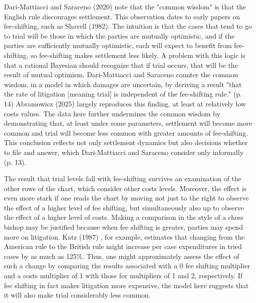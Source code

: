 \documentclass{article}
\begin{document}
Dari-Mattiacci and Saraceno (2020) note that the "common wisdom" is that the English rule discourages settlement. This observation dates to early papers on fee-shifting, such as Shavell (1982). The intuition is that the cases that tend to go to trial will be those in which the parties are mutually optimistic, and if the parties are sufficiently mutually optimistic, each will expect to benefit from fee-shifting, so fee-shifting makes settlement less likely. A problem with this logic is that a rational Bayesian should recognize that if trial occurs, that will be the result of mutual optimism. Dari-Mattiacci and Saraceno counter the common wisdom, in a model in which damages are uncertain, by deriving a result "that the rate of litigation [meaning trial] is independent of the fee-shifting rule." (p. 14) Abramowicz (2025) largely reproduces this finding, at least at relatively low costs values. The data here further undermines the common wisdom by demonstrating that, at least under some parameters, settlement will become more common and trial will become less common with greater amounts of fee-shifting. This conclusion reflects not only settlement dynamics but also decisions whether to file and answer, which Dari-Mattiacci and Saraceno consider only informally (p. 13). 

The result that trial levels fall with fee-shifting survives an examination of the other rows of the chart, which consider other costs levels. Moreover, the effect is even more stark if one reads the chart by moving not just to the right to observe the effect of a higher level of fee shifting, but simultaneously also up to observe the effect of a higher level of costs. Making a comparison in the style of a chess bishop may be justified because when fee shifting is greater, parties may spend more on litigation. Katz (1987) \cite{katz}, for example, estimates that changing from the American rule to the British rule might increase per case expenditures in tried cases by as much as 125\%. Thus, one might approximately assess the effect of such a change by comparing the results associated with a 0 fee shifting multiplier and a costs multiplier of 1 with those for multipliers of 1 and 2, respectively. If fee shifting in fact makes litigation more expensive, the model here suggests that it will also make trial considerably less common.
\end{document}
